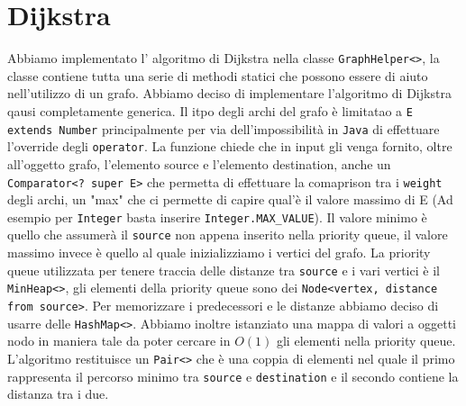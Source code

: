 \documentclass[letterpaper]{report}
\begin{document}
\section{Dijkstra}
Abbiamo implementato l' algoritmo di Dijkstra nella classe \verb|GraphHelper<>|, 
la classe contiene tutta una serie di methodi statici che possono essere di aiuto 
nell'utilizzo di un grafo. \newline
Abbiamo deciso di implementare l'algoritmo di Dijkstra qausi completamente generica.
Il itpo degli archi del grafo è limitatao a \verb|E extends Number| principalmente 
per via dell'impossibilità in \verb|Java| di effettuare l'override degli \verb|operator|.
\newline
La funzione chiede che in input gli venga fornito, oltre all'oggetto grafo, l'elemento 
source e l'elemento destination, anche un \verb|Comparator<? super E>| che 
permetta di effettuare la comaprison tra i \verb|weight| degli archi, un "max" che ci 
permette di capire qual'è il valore massimo di E (Ad esempio per \verb|Integer| basta inserire 
\verb|Integer.MAX_VALUE|). Il valore minimo è quello che assumerà il \verb|source| 
non appena inserito nella priority queue, il valore massimo invece è quello al 
quale inizializziamo i vertici del grafo. \newline
La priority queue utilizzata per tenere traccia delle distanze tra \verb|source| e
i vari vertici è il \verb|MinHeap<>|, gli elementi della priority queue sono dei\newline 
\verb|Node<vertex, distance from source>|.
Per memorizzare i predecessori e le distanze abbiamo deciso di usarre delle 
\verb|HashMap<>|. \newline
Abbiamo inoltre istanziato una mappa di valori a oggetti nodo in maniera tale da 
poter cercare in $O(1)$ gli elementi nella priority queue. \newline
L'algoritmo restituisce un \verb|Pair<>| che è una coppia di elementi nel quale il
primo rappresenta il percorso minimo tra \verb|source| e \verb|destination| e il 
secondo contiene la distanza tra i due.
\end{document}

